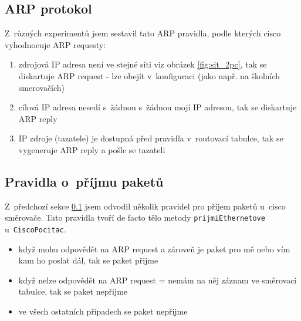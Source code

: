 
\newpage

\subsection{ARP protokol} \label{arp}
\cite{wiki:arp}

Z~různých experimentů jsem sestavil tato ARP pravidla, podle kterých cisco vyhodnocuje ARP requesty:
\begin{enumerate}
 \item zdrojová IP adresa není ve stejné síti viz obrázek \ref{fig:sit_2pc}, tak se diskartuje ARP request - lze obejít v~konfiguraci (jako např. na školních smerovačích)
 \item cílová IP adresa nesedí s~žádnou s~žádnou mojí IP adresou, tak se diskartuje ARP reply
 \item IP zdroje (tazatele) je dostupná před pravidla v~routovací tabulce, tak se vygeneruje ARP reply a pošle se tazateli
\end{enumerate}


\subsection{Pravidla o~příjmu paketů} 
Z~předchozí sekce \ref{arp} jsem odvodil několik pravidel pro příjem paketů u~cisco směrovače. Tato pravidla tvoří de facto tělo metody \verb|prijmiEthernetove| u~\verb|CiscoPocitac|.

\begin{itemize}
 \item když mohu odpovědět na ARP request a zároveň je paket pro mě nebo vím kam ho poslat dál, tak se paket přijme
 \item když nelze odpovědět na ARP request = nemám na něj záznam ve směrovací tabulce, tak se paket nepřijme
 \item ve všech ostatních případech se paket nepřijme
\end{itemize}




